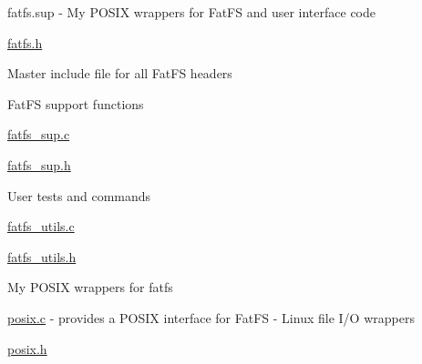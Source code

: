 fatfs.\+sup -\/ My P\+O\+S\+IX wrappers for Fat\+FS and user interface code
\begin{DoxyItemize}
\item \hyperlink{fatfs_8h}{fatfs.\+h}
\begin{DoxyItemize}
\item Master include file for all Fat\+FS headers
\end{DoxyItemize}
\item Fat\+FS support functions
\begin{DoxyItemize}
\item \hyperlink{fatfs__sup_8c}{fatfs\+\_\+sup.\+c}
\item \hyperlink{fatfs__sup_8h}{fatfs\+\_\+sup.\+h}
\end{DoxyItemize}
\item User tests and commands
\begin{DoxyItemize}
\item \hyperlink{fatfs__utils_8c}{fatfs\+\_\+utils.\+c}
\item \hyperlink{fatfs__utils_8h}{fatfs\+\_\+utils.\+h}
\end{DoxyItemize}
\item My P\+O\+S\+IX wrappers for fatfs
\begin{DoxyItemize}
\item \hyperlink{posix_8c}{posix.\+c} -\/ provides a P\+O\+S\+IX interface for Fat\+FS -\/ Linux file I/O wrappers
\item \hyperlink{posix_8h}{posix.\+h}
\end{DoxyItemize}
\end{DoxyItemize}

